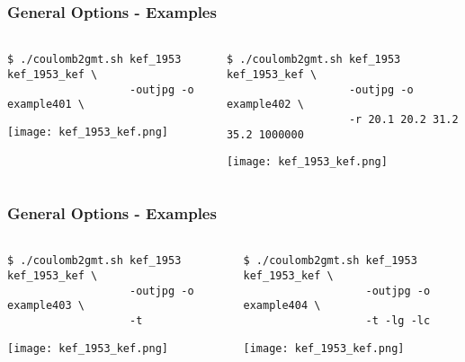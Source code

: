 \begin{frame}[t,fragile]
  \frametitle{General Options - Examples}
  \framesubtitle{}
  \label{fr4:hist_pics}
\begin{columns}[t]
  \begin{column}{.5\textwidth}
\begin{scriptsize}
\begin{verbatim}
$ ./coulomb2gmt.sh kef_1953 kef_1953_kef \
                   -outjpg -o example401 \
\end{verbatim}
\end{scriptsize}
\centering
\texttt{[image: kef\_1953\_kef.png]}
  \end{column}
  \begin{column}{.5\textwidth}
  \begin{scriptsize}
\begin{verbatim}
$ ./coulomb2gmt.sh kef_1953 kef_1953_kef \
                   -outjpg -o example402 \
                   -r 20.1 20.2 31.2 35.2 1000000
\end{verbatim}
\end{scriptsize}
\centering
  \texttt{[image: kef\_1953\_kef.png]}
  \end{column}
\end{columns}

\end{frame}
\note{}

\begin{frame}[t,fragile]
  \frametitle{General Options - Examples}
  \framesubtitle{}
  \label{fr4:hist_pics}
\begin{columns}[t]
  \begin{column}{.5\textwidth}
\begin{scriptsize}
\begin{verbatim}
$ ./coulomb2gmt.sh kef_1953 kef_1953_kef \
                   -outjpg -o example403 \
                   -t
\end{verbatim}
\end{scriptsize}
\centering
\texttt{[image: kef\_1953\_kef.png]}
  \end{column}
  \begin{column}{.5\textwidth}
  \begin{scriptsize}
\begin{verbatim}
$ ./coulomb2gmt.sh kef_1953 kef_1953_kef \
                   -outjpg -o example404 \
                   -t -lg -lc
\end{verbatim}
\end{scriptsize}
\centering
  \texttt{[image: kef\_1953\_kef.png]}
  \end{column}
\end{columns}

\end{frame}
\note{}

